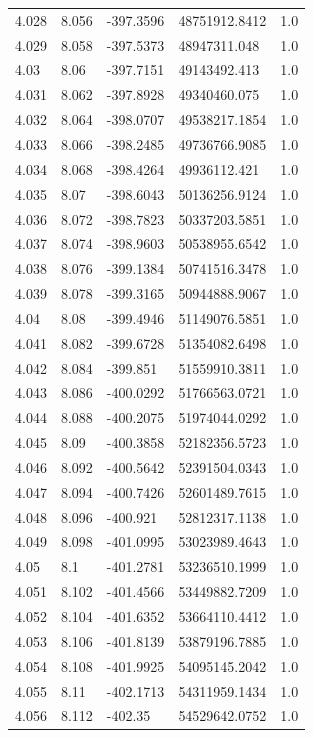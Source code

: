 \begin{tabular}{lllll}
4.028 & 8.056 & -397.3596 & 48751912.8412 & 1.0 \\
4.029 & 8.058 & -397.5373 & 48947311.048 & 1.0 \\
4.03 & 8.06 & -397.7151 & 49143492.413 & 1.0 \\
4.031 & 8.062 & -397.8928 & 49340460.075 & 1.0 \\
4.032 & 8.064 & -398.0707 & 49538217.1854 & 1.0 \\
4.033 & 8.066 & -398.2485 & 49736766.9085 & 1.0 \\
4.034 & 8.068 & -398.4264 & 49936112.421 & 1.0 \\
4.035 & 8.07 & -398.6043 & 50136256.9124 & 1.0 \\
4.036 & 8.072 & -398.7823 & 50337203.5851 & 1.0 \\
4.037 & 8.074 & -398.9603 & 50538955.6542 & 1.0 \\
4.038 & 8.076 & -399.1384 & 50741516.3478 & 1.0 \\
4.039 & 8.078 & -399.3165 & 50944888.9067 & 1.0 \\
4.04 & 8.08 & -399.4946 & 51149076.5851 & 1.0 \\
4.041 & 8.082 & -399.6728 & 51354082.6498 & 1.0 \\
4.042 & 8.084 & -399.851 & 51559910.3811 & 1.0 \\
4.043 & 8.086 & -400.0292 & 51766563.0721 & 1.0 \\
4.044 & 8.088 & -400.2075 & 51974044.0292 & 1.0 \\
4.045 & 8.09 & -400.3858 & 52182356.5723 & 1.0 \\
4.046 & 8.092 & -400.5642 & 52391504.0343 & 1.0 \\
4.047 & 8.094 & -400.7426 & 52601489.7615 & 1.0 \\
4.048 & 8.096 & -400.921 & 52812317.1138 & 1.0 \\
4.049 & 8.098 & -401.0995 & 53023989.4643 & 1.0 \\
4.05 & 8.1 & -401.2781 & 53236510.1999 & 1.0 \\
4.051 & 8.102 & -401.4566 & 53449882.7209 & 1.0 \\
4.052 & 8.104 & -401.6352 & 53664110.4412 & 1.0 \\
4.053 & 8.106 & -401.8139 & 53879196.7885 & 1.0 \\
4.054 & 8.108 & -401.9925 & 54095145.2042 & 1.0 \\
4.055 & 8.11 & -402.1713 & 54311959.1434 & 1.0 \\
4.056 & 8.112 & -402.35 & 54529642.0752 & 1.0 \\

\end{tabular}
